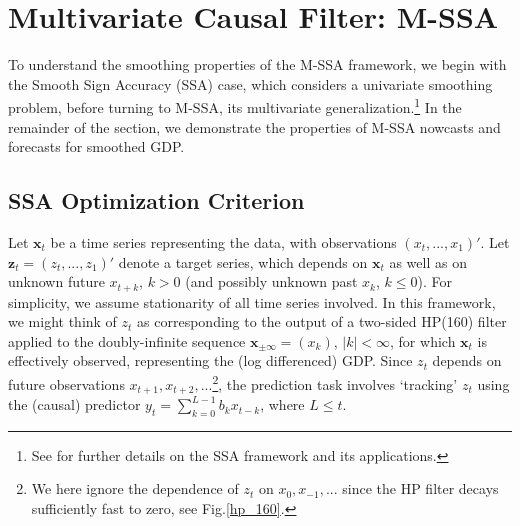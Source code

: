 \documentclass[11pt,a4paper]{article}
\begin{document}
\section{Multivariate Causal Filter: M-SSA}\label{sec:mSSA}

To understand the smoothing properties of the M-SSA framework, we begin with the Smooth Sign Accuracy (SSA) case, which considers a univariate smoothing problem, before turning to M-SSA, its multivariate generalization.\footnote{See \cite{Wildi2024} for further details on the SSA framework and its applications.} In the remainder of the section, we demonstrate the properties of M-SSA nowcasts and forecasts for smoothed GDP.

\subsection{SSA Optimization Criterion}

Let $\mathbf{x}_t$ be a time series representing the data, with observations $(x_{t},...,x_{1})'$. Let $\mathbf{z}_t=(z_{t},...,z_1)'$  denote a target series, which depends on $\mathbf{x}_t$ as well as on unknown future $x_{t+k}$, $k>0$ (and possibly unknown past $x_k$, $k\leq 0$). For simplicity, we assume stationarity of all time series involved. In this framework, we might think of ${z}_t$ as corresponding to the output of a two-sided HP(160) filter applied to the doubly-infinite sequence $\mathbf{x}_{\pm \infty}=(x_k)$, $|k|<\infty$, for which $\mathbf{x}_t$ is effectively observed, representing the (log differenced) GDP. Since $z_{t}$  depends on future observations $x_{t+1},x_{t+2},...$\footnote{We here ignore the dependence of $z_t$ on $x_0,x_{-1},...$ since the HP filter decays sufficiently fast to zero, see Fig.\ref{hp_160}.}, the prediction task involves `tracking' $z_{t}$  using the (causal) predictor $y_{t}=\sum_{k=0}^{L-1} b_{k}x_{t-k}$, where $L\leq t$.
\end{document}

